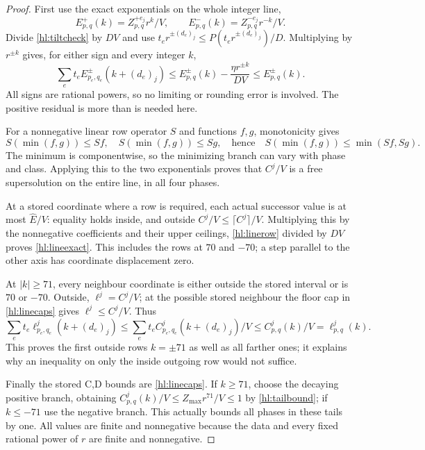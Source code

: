 \begin{proof}
First use the exact exponentials on the whole integer line,
\[
 E^+_{p,q}(k)=Z^{+e_j}_{p,q}r^k/V,\qquad
 E^-_{p,q}(k)=Z^{-e_j}_{p,q}r^{-k}/V.
\]
Divide \eqref{hl:tiltcheck} by $DV$ and use
$t_e r^{\pm(d_e)_j}\le P(t_e r^{\pm(d_e)_j})/D$.  Multiplying
by $r^{\pm k}$ gives, for either sign and every integer $k$,
\[
 \sum_e t_e E^\pm_{p_e,q_e}(k+(d_e)_j)
 \le E^\pm_{p,q}(k)-\frac{\eta r^{\pm k}}{DV}
 \le E^\pm_{p,q}(k).
\]
All signs are rational powers, so no limiting or rounding error
is involved.  The positive residual is more than is needed here.

For a nonnegative linear row operator $S$ and functions $f,g$,
monotonicity gives
\begin{equation}\label{hl:min}
 S(\min(f,g))\le Sf,\quad S(\min(f,g))\le Sg,
 \quad\text{hence}\quad S(\min(f,g))\le\min(Sf,Sg).
\end{equation}
The minimum is componentwise, so the minimizing branch can vary
with phase and class.  Applying this to the two exponentials
proves that $C^j/V$ is a free supersolution on the entire line,
in all four phases.

At a stored coordinate where a row is required, each actual
successor value is at most $\widehat E/V$: equality holds inside,
and outside $C^j/V\le\lceil C^j\rceil/V$.
Multiplying this by the nonnegative coefficients and their
upper ceilings, \eqref{hl:linerow} divided by $DV$ proves
\eqref{hl:lineexact}.  This includes the rows at $70$ and $-70$;
a step parallel to the other axis has coordinate displacement zero.

At $|k|\ge71$, every neighbour coordinate is either outside the
stored interval or is $70$ or $-70$.  Outside, $\ell^j=C^j/V$;
at the possible stored neighbour the floor cap in
\eqref{hl:linecaps} gives $\ell^j\le C^j/V$.  Thus
\[
 \sum_e t_e\ell^j_{p_e,q_e}(k+(d_e)_j)
 \le\sum_e t_e C^j_{p_e,q_e}(k+(d_e)_j)/V
 \le C^j_{p,q}(k)/V=\ell^j_{p,q}(k).
\]
This proves the first outside rows $k=\pm71$ as well as all
farther ones; it explains why an inequality on only the inside
outgoing row would not suffice.

Finally the stored C,D bounds are \eqref{hl:linecaps}.  If
$k\ge71$, choose the decaying positive branch, obtaining
$C^j_{p,q}(k)/V\le Z_{\max}r^{71}/V\le1$ by
\eqref{hl:tailbound}; if $k\le-71$ use the negative branch.
This actually bounds all phases in these tails by one.  All
values are finite and nonnegative because the data and every
fixed rational power of $r$ are finite and nonnegative.
\end{proof}

